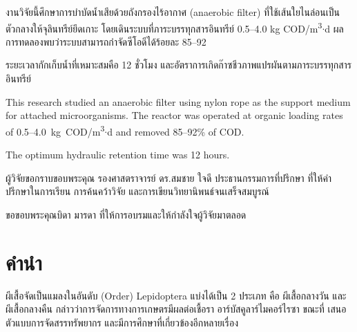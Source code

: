 \documentclass[thai]{kuthesis}
\begin{document}
\frontmatter
\makecover
\makeapproval
\maketitlepage

\begin{thaiabstract}
  งานวิจัยนี้ศึกษาการบำบัดน้ำเสียด้วยถังกรองไร้อากาศ (anaerobic filter) ที่ใช้เส้นใยไนล่อนเป็นตัวกลางให้จุลินทรีย์ยึดเกาะ
  โดยเดินระบบที่ภาระบรรทุกสารอินทรีย์ 0.5--4.0 kg COD/m\textsuperscript{3}$\cdot$d
  ผลการทดลองพบว่าระบบสามารถกำจัดซีโอดีได้ร้อยละ 85--92

  ระยะเวลากักเก็บน้ำที่เหมาะสมคือ 12 ชั่วโมง และอัตราการเกิดก๊าซชีวภาพแปรผันตามภาระบรรทุกสารอินทรีย์
\end{thaiabstract}

\begin{englishabstract}
  This research studied an anaerobic filter using nylon rope as the support medium for
  attached microorganisms. The reactor was operated at organic loading rates of
  0.5--4.0~kg~COD/m\textsuperscript{3}$\cdot$d and removed 85--92\% of COD.

  The optimum hydraulic retention time was 12 hours.
\end{englishabstract}

\begin{acknowledgments}
  ผู้วิจัยขอกราบขอบพระคุณ รองศาสตราจารย์ ดร.สมชาย ใจดี ประธานกรรมการที่ปรึกษา
  ที่ให้คำปรึกษาในการเรียน การค้นคว้าวิจัย และการเขียนวิทยานิพนธ์จนเสร็จสมบูรณ์

  ขอขอบพระคุณบิดา มารดา ที่ให้การอบรมและให้กำลังใจผู้วิจัยมาตลอด
\end{acknowledgments}

\tableofcontents
\listoftables
\listoffigures

\begin{abbreviations}
\end{abbreviations}

\mainmatter

\chapter{คำนำ}

ผีเสื้อจัดเป็นแมลงในอันดับ (Order) Lepidoptera แบ่งได้เป็น 2 ประเภท คือ ผีเสื้อกลางวัน
และผีเสื้อกลางคืน \textcite{boddington2000a} กล่าวว่าการจัดการทางการเกษตรมีผลต่อเชื้อรา
อาร์บัสคูลาร์ไมคอร์ไรซา ขณะที่ \textcite{patcharaporn2552} เสนอตัวแบบการจัดสรรทรัพยากร
และมีการศึกษาที่เกี่ยวข้องอีกหลายเรื่อง \parencite{siriyaporn2552,chutima2551,peterson2004}
\end{document}
